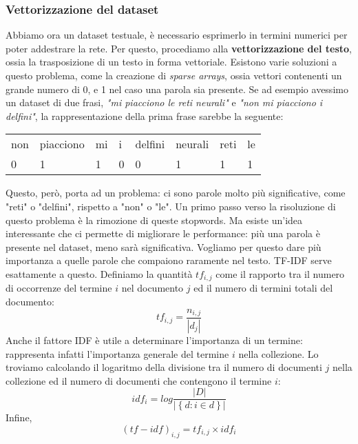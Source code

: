 \subsubsection{Vettorizzazione del dataset}
Abbiamo ora un dataset testuale, è necessario esprimerlo in termini numerici per poter addestrare la rete. Per questo, procediamo alla \textbf{vettorizzazione del testo}, ossia la trasposizione di un testo in forma vettoriale. Esistono varie soluzioni a questo problema, come la creazione di \textit{sparse arrays}, ossia vettori contenenti un grande numero di 0, e 1 nel caso una parola sia presente.
Se ad esempio avessimo un dataset di due frasi, \textit{"mi piacciono le reti neurali"} e \textit{"non mi piacciono i delfini"}, la rappresentazione della prima frase sarebbe la seguente:
\begin{table}[]
    \begin{tabular}{llllllll}
        non & piacciono & mi & i & delfini & neurali & reti & le \\
        0   & 1         & 1  & 0 & 0       & 1       & 1    & 1
    \end{tabular}
\end{table}
Questo, però, porta ad un problema: ci sono parole molto più significative, come "reti" o "delfini", rispetto a "non" o "le". Un primo passo verso la risoluzione di questo problema è la rimozione di queste stopwords. Ma esiste un'idea interessante che ci permette di migliorare le performance: più una parola è presente nel dataset, meno sarà significativa. Vogliamo per questo dare più importanza a quelle parole che compaiono raramente nel testo. TF-IDF serve esattamente a questo. Definiamo la quantità $tf_{i,j}$ come il rapporto tra il numero di occorrenze del termine $i$ nel documento $j$ ed il numero di termini totali del documento:
\begin{displaymath}
    tf_{i,j}=\frac{n_{i,j}}{|d_j|}
\end{displaymath}
Anche il fattore IDF è utile a determinare l'importanza di un termine: rappresenta infatti l'importanza generale del termine $i$ nella collezione. Lo troviamo calcolando il logaritmo della divisione tra il numero di documenti $j$ nella collezione ed il numero di documenti che contengono il termine $i$:
\begin{displaymath}
    idf_i=log\frac{|D|}{|\left\{d:i\in d\right\}|}
\end{displaymath}
Infine,
\begin{displaymath}
    (tf-idf)_{i,j} = tf_{i,j} \times idf_i
\end{displaymath}
